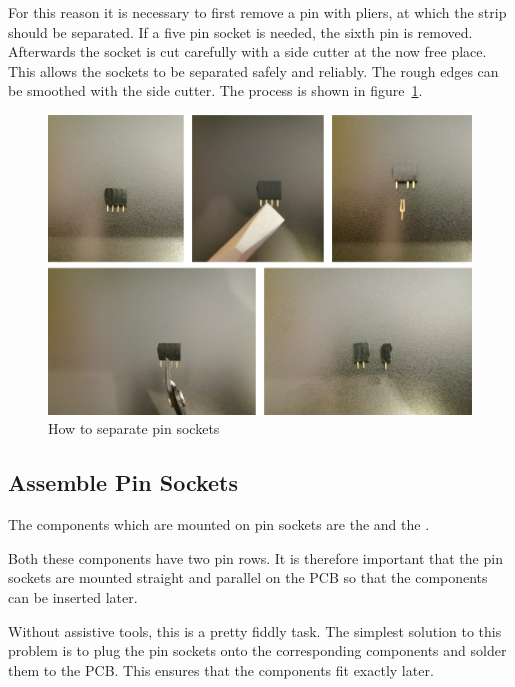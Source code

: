 For this reason it is necessary to first remove a pin with pliers, at which the strip should be separated. If a five pin socket is needed, the sixth pin is removed. Afterwards the socket is cut carefully with a side cutter at the now free place. This allows the sockets to be separated safely and reliably. The rough edges can be smoothed with the side cutter. The process is shown in figure~\ref{fig:pinSocket}.%

\begin{figure}[ht!]%
	\begin{centered}%
		\includegraphics[width=\linewidth]{images/PinSocket.jpg}%
		\caption{How to separate pin sockets}%
		\label{fig:pinSocket}%
	\end{centered}%
\end{figure}%

\subsection{Assemble Pin Sockets}
The components which are mounted on pin sockets are the  and the .%

Both these components have two pin rows. It is therefore important that the pin sockets are mounted straight and parallel on the PCB so that the components can be inserted later.%

Without assistive tools, this is a pretty fiddly task. The simplest solution to this problem is to plug the pin sockets onto the corresponding components and solder them to the PCB. This ensures that the components fit exactly later.%

